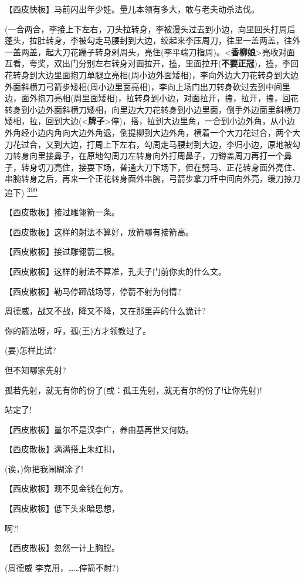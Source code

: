 【西皮快板】马前闪出年少娃。量儿本领有多大，敢与老夫动杀法伐。

(一合两合，李接上下左右，刀头拉转身，李被漫头过去到小边，向里回头打周后蓬头，拉肚转身，李被勾走马腰封到大边，绞起来李压周刀，往里一盖两盖，往外一盖两盖，起大刀花蹦子转身剁周头，亮住(李平端刀指周)。\textless{}\textbf{香柳娘}\textgreater{}亮收对面互看，夸奖，双出门分别左右转身对面拉开，搕，里面拉开(\textbf{不要正冠})，搕，李回花转身到大边里面抱刀单腿立亮相(周小边外面矮相)，李向外边大刀花转身到大边外面斜横刀弓箭步矮相(周小边里面亮相)，李向上场门出刀转身砍过去到中间里边，面外抱刀亮相(周里面矮相)，拉转身到小边，对面拉开，搕，拉开，搕，回花转身到小边外面斜横刀矮相，向里边大刀花转身到小边里面，倒手外边面里斜横刀矮相，拉，回到大边(\textless{}\textbf{牌子}\textgreater{}停)，搭，拉到大边里角，一合到小边外角，从小边外角经小边内角向大边外角退，倒提柳到大边外角，横着一个大刀花过合，两个大刀花过合，又到大边，打周上下左右，勾周走马腰封到大边，李归小边，原地被勾刀转身向里接鼻子，在原地勾周刀左转身向外打周鼻子，刀鐏盖周刀再打一个鼻子，转身切刀亮住，接耍下场，普通大刀下场下，但在劈马、正花转身面外亮住、串腕转身之后，再来一个正花转身面外串腕，弓箭步拿刀杆中间向外亮，缓刀掠刀追下)
\protect\hyperlink{fn399}{\textsuperscript{399}}

【西皮散板】接过雕翎箭一条。

【西皮散板】这样的射法不算好，放箭哪有接箭高。

【西皮散板】接过雕翎箭二根。

【西皮散板】这样的射法不算准，孔夫子门前你卖的什么文。

【西皮散板】勒马停蹄战场等，停箭不射为何情?

周德威，战又不战，降又不降，又在那里弄的什么诡计?

你的箭法呀，哼，孤(王)方才领教过了。

(要)怎样比试?

但不知哪家先射?

孤若先射，就无有你的份了(或：孤王先射，就无有尔的份了!让你先射)!

站定了!

【西皮散板】量尔不是汉李广，养由基再世又何妨。

【西皮散板】满满搭上朱红扣，

(诶，)你把我闹糊涂了!

【西皮散板】观不见金钱在何方。

【西皮散板】低下头来暗思想，

啊?!

【西皮散板】忽然一计上胸膛。

(周德威 李克用，\ldots{}\ldots{}停箭不射?)

